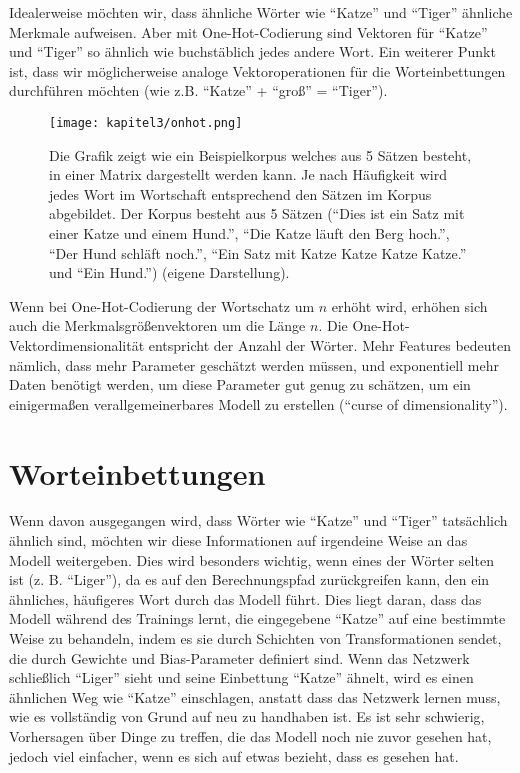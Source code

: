 Idealerweise möchten wir, dass ähnliche Wörter wie \enquote{Katze} und \enquote{Tiger} ähnliche Merkmale aufweisen. Aber mit One-Hot-Codierung sind Vektoren für \enquote{Katze}  und \enquote{Tiger} so ähnlich wie buchstäblich jedes andere Wort. Ein weiterer Punkt ist, dass wir möglicherweise analoge Vektoroperationen für die Worteinbettungen durchführen möchten (wie z.B. \enquote{Katze} + \enquote{groß} = \enquote{Tiger}).

\begin{figure}[H]
    \centering
    \texttt{[image: kapitel3/onhot.png]}
    \caption[One-Hot-Codierung als Eingabematrix]{Die Grafik zeigt wie ein Beispielkorpus welches aus 5 Sätzen besteht, in einer Matrix dargestellt werden kann. Je nach Häufigkeit wird jedes Wort im Wortschaft entsprechend den Sätzen im Korpus abgebildet. Der Korpus besteht aus 5 Sätzen (\enquote{Dies ist ein Satz mit einer Katze und einem Hund.}, \enquote{Die Katze läuft den Berg hoch.}, \enquote{Der Hund schläft noch.}, \enquote{Ein Satz mit Katze Katze Katze Katze.} und \enquote{Ein Hund.}) (eigene Darstellung).}
    \label{OneHotGrafik}
\end{figure}

Wenn bei One-Hot-Codierung der Wortschatz um $n$ erhöht wird, erhöhen sich auch die Merkmalsgrößenvektoren um die Länge $n$. Die One-Hot-Vektordimensionalität entspricht der Anzahl der Wörter. Mehr Features bedeuten nämlich, dass mehr Parameter geschätzt werden müssen, und exponentiell mehr Daten benötigt werden, um diese Parameter gut genug zu schätzen, um ein einigermaßen verallgemeinerbares Modell zu erstellen (\enquote{curse of dimensionality}).

\section{Worteinbettungen}
Wenn davon ausgegangen wird, dass Wörter wie \enquote{Katze} und \enquote{Tiger} tatsächlich ähnlich sind, möchten wir diese Informationen auf irgendeine Weise an das Modell weitergeben. Dies wird besonders wichtig, wenn eines der Wörter selten ist (z. B. \enquote{Liger}), da es auf den Berechnungspfad zurückgreifen kann, den ein ähnliches, häufigeres Wort durch das Modell führt. Dies liegt daran, dass das Modell während des Trainings lernt, die eingegebene \enquote{Katze} auf eine bestimmte Weise zu behandeln, indem es sie durch Schichten von Transformationen sendet, die durch Gewichte und Bias-Parameter definiert sind. Wenn das Netzwerk schließlich \enquote{Liger} sieht und seine Einbettung \enquote{Katze} ähnelt, wird es einen ähnlichen Weg wie \enquote{Katze} einschlagen, anstatt dass das Netzwerk lernen muss, wie es vollständig von Grund auf neu zu handhaben ist. Es ist sehr schwierig, Vorhersagen über Dinge zu treffen, die das Modell noch nie zuvor gesehen hat, jedoch viel einfacher, wenn es sich auf etwas bezieht, dass es gesehen hat.

